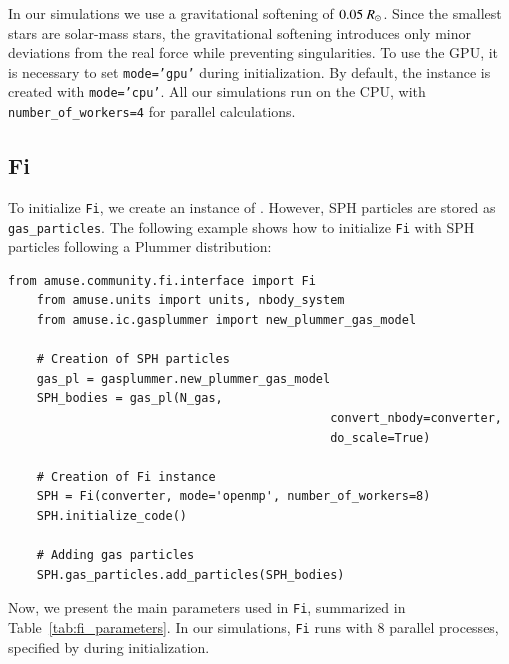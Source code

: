 In our simulations we use a gravitational softening of $0.05~R_{\rm \odot}$. Since the smallest stars are solar-mass stars, the gravitational softening introduces only minor deviations from the real force while preventing singularities. To use the GPU, it is necessary to set \texttt{mode='gpu'} during initialization. By default, the  instance is created with \texttt{mode='cpu'}. All our simulations run on the CPU, with \texttt{number\_of\_workers=4} for parallel calculations.

\subsection{Fi}

To initialize \texttt{Fi}, we create an instance of . However, SPH particles are stored as \texttt{gas\_particles}. The following example shows how to initialize \texttt{Fi} with SPH particles following a Plummer distribution:

\begin{lstlisting}[caption=Example setup for \texttt{FI} with gas particles, label=lst:Fi_instance_creation]
	from amuse.community.fi.interface import Fi
	from amuse.units import units, nbody_system
	from amuse.ic.gasplummer import new_plummer_gas_model
	
	# Creation of SPH particles
	gas_pl = gasplummer.new_plummer_gas_model
	SPH_bodies = gas_pl(N_gas,
											 convert_nbody=converter, 
											 do_scale=True)
	
	# Creation of Fi instance
	SPH = Fi(converter, mode='openmp', number_of_workers=8)
	SPH.initialize_code()
	
	# Adding gas particles
	SPH.gas_particles.add_particles(SPH_bodies) 
\end{lstlisting}

Now, we present the main parameters used in \texttt{Fi}, summarized in Table~\ref{tab:fi_parameters}. In our simulations, \texttt{Fi} runs with 8 parallel processes, specified by  during initialization.

